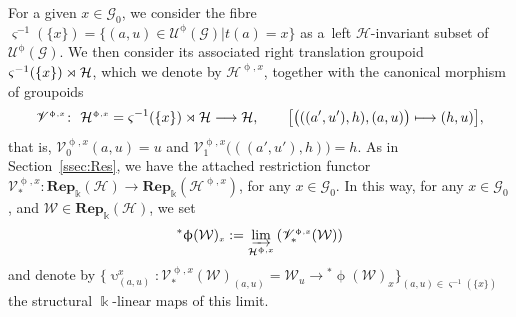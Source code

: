 \documentclass[11pt]{article}
\numberwithin{equation}{section}
\newcommand{\Rep}[1]{\mathbf{Rep}_{\Sscript{\Bbbk}}(#1)}
\newcommand{\Go}{\cG_{\Sscript{0}}}
\newcommand{\uU}{\mathscr{U}}
\newcommand{\vV}{\mathscr{V}}
\newcommand{\cG}{{\mathcal G}}
\newcommand{\cH}{{\mathcal H}}
\newcommand{\cW}{{\mathcal W}}
\newcommand{\Sscript}[1]{\scriptscriptstyle{#1}}
\newcommand{\injlimit}[2]{\varinjlim_{#1}\left({#2}\right)}
\newcommand{\upg}{\uU^{\Sscript{\upphi}}(\cG)}
\begin{document}
For a given $x \in\Go$, we consider the fibre $\varsigma^{-1}(\{x\})=\big\{ (a,u) \in \upg| t(a)=x \big\}$ as a~left $\cH$-invariant subset of $\upg$. We then consider its associated right translation groupoid $\varsigma^{-1}(\{x\}) \rJoin \cH$, which we denote by $\cH^{\Sscript{\upphi, x}}$, together with the canonical morphism of groupoids
\begin{gather*}
\vV^{\Sscript{\upphi, x}}\colon \ \cH^{\Sscript{\upphi, x}}= \varsigma^{-1}(\{x\}) \rJoin \cH \longrightarrow \cH, \qquad \big[ \big( ((a',u'),h), (a,u)\big) \longmapsto (h,u) \big],
\end{gather*}
that is, $\vV^{\Sscript{\upphi, x}}_{\Sscript{0}}(a,u)=u$ and $\vV^{\Sscript{\upphi, x}}_{\Sscript{1}}\big( ((a',u'),h) \big)=h$. As in Section~\ref{ssec:Res}, we have the attached restriction
functor $\vV^{\Sscript{\upphi, x}}_*\colon \Rep{\cH} \to \Rep{\cH^{\Sscript\upphi, x}}$, for any $x \in \Go$.
In this way, for any $x \in \Go$, and $\cW \in \Rep{\cH}$, we set\begin{gather}\label{Eq:SPx} {}^*\upphi(\cW)_{\Sscript{x}}: = \injlimit{\cH^{\Sscript{\upphi,
x}}}{\vV^{\Sscript{\upphi, x}}_*(\cW)}
\end{gather}
and denote by $\big\{\upupsilon^{\Sscript{x}}_{\Sscript{(a, u)}}\colon \vV^{\Sscript{\upphi, x}}_*(\cW)_{\Sscript{(a, u)}}=\cW_{\Sscript{u}} \longrightarrow {}^*\upphi(\cW)_{\Sscript{x}} \big\}_{\Sscript{(a, u) \in \varsigma^{-1}(\{x\})}}$ the structural $\Bbbk$-linear maps of this limit.
\end{document}
